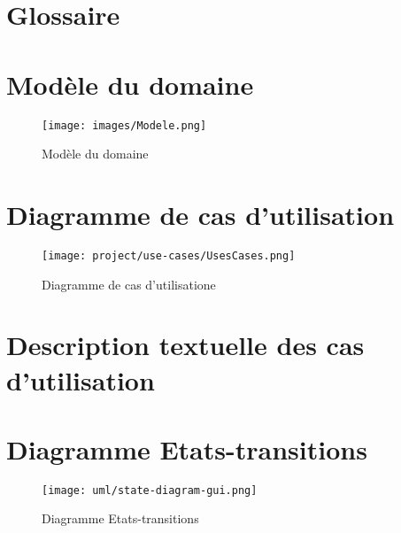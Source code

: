 \documentclass[a4paper,10pt]{article}
\begin{document}
\begin{titlepage}
  
\end{titlepage}
\tableofcontents
\pagebreak

\section{Glossaire}
  

\FloatBarrier
\section{Modèle du domaine}
  \begin{figure}[h!]
    \begin{center}
      \texttt{[image: images/Modele.png]}
      \caption{Modèle du domaine}
      \label{fig:modele}
    \end{center}
  \end{figure}
  
\FloatBarrier
\section{Diagramme de cas d'utilisation}
  \begin{figure}[h!]
    \begin{center}
      \texttt{[image: project/use-cases/UsesCases.png]}
      \caption{Diagramme de cas d'utilisatione}
      \label{fig:useCase}
    \end{center}
  \end{figure}

\FloatBarrier
\section{Description textuelle des cas d’utilisation}
  
  
   

\FloatBarrier
\section{Diagramme Etats-transitions}
  \begin{figure}[h!]
    \begin{center}
      \texttt{[image: uml/state-diagram-gui.png]}
      \caption{Diagramme Etats-transitions}
      \label{fig:stateGui}
    \end{center}
  \end{figure}
  
\end{document}
